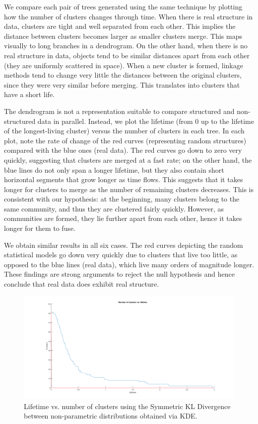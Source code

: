 \documentclass[pdftex,11pt,a4paper]{article}
\theoremstyle{definition}
\theoremstyle{remark}
\begin{document}
\par We compare each pair of trees generated using the same technique by plotting how the number of clusters changes through time. When there is real structure in data, clusters are tight and well separated from each other. This implies the distance between clusters becomes larger as smaller clusters merge. This maps visually to long branches in a dendrogram. On the other hand, when there is no real structure in data, objects tend to be similar distances apart from each other (they are uniformly scattered in space). When a new cluster is formed, linkage methods tend to change very little the distances between the original clusters, since they were very similar before merging. This translates into clusters that have a short life.
\par The dendrogram is not a representation suitable to compare structured and non-structured data in parallel. Instead, we plot the lifetime (from 0 up to the lifetime of the longest-living cluster) versus the number of clusters in each tree. In each plot, note the rate of change of the red curves (representing random structures) compared with the blue ones (real data). The red curves go down to zero very quickly, suggesting that clusters are merged at a fast rate; on the other hand, the blue lines do not only span a longer lifetime, but they also contain short horizontal segments that grow longer as time flows. This suggests that it takes longer for clusters to merge as the number of remaining clusters decreases. This is consistent with our hypothesis: at the beginning, many clusters belong to the same community, and thus they are clustered fairly quickly. However, as communities are formed, they lie further apart from each other, hence it takes longer for them to fuse.
\par We obtain similar results in all six cases. The red curves depicting the random statistical models go down very quickly due to clusters that live too little, as opposed to the blue lines (real data), which live many orders of magnitude longer. These findings are strong arguments to reject the null hypothesis and hence conclude that real data does exhibit real structure.
\begin{figure}[H]
\centering
\includegraphics[width=\textwidth]{images/lifetime_kde_skld}
\caption{Lifetime vs. number of clusters using the Symmetric KL Divergence between non-parametric distributions obtained via KDE.}
\label{fig_lt_kde_skld}
\end{figure}
\end{document}
